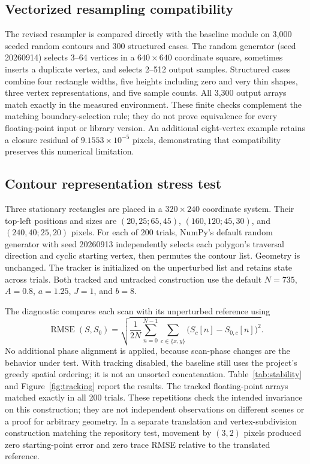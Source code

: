 \documentclass[11pt,a4paper]{article}
\begin{document}
\subsection{Vectorized resampling compatibility}
The revised resampler is compared directly with the baseline module on 3,000 seeded random contours and 300 structured cases. The random generator (seed 20260914) selects 3--64 vertices in a $640\times640$ coordinate square, sometimes inserts a duplicate vertex, and selects 2--512 output samples. Structured cases combine four rectangle widths, five heights including zero and very thin shapes, three vertex representations, and five sample counts. All 3,300 output arrays match exactly in the measured environment. These finite checks complement the matching boundary-selection rule; they do not prove equivalence for every floating-point input or library version. An additional eight-vertex example retains a closure residual of $9.1553\times10^{-5}$ pixels, demonstrating that compatibility preserves this numerical limitation.

\subsection{Contour representation stress test}
Three stationary rectangles are placed in a $320\times240$ coordinate system. Their top-left positions and sizes are $(20,25;65,45)$, $(160,120;45,30)$, and $(240,40;25,20)$ pixels. For each of 200 trials, NumPy's default random generator with seed 20260913 independently selects each polygon's traversal direction and cyclic starting vertex, then permutes the contour list. Geometry is unchanged. The tracker is initialized on the unperturbed list and retains state across trials. Both tracked and untracked construction use the default $N=735$, $A=0.8$, $a=1.25$, $J=1$, and $b=8$.

The diagnostic compares each scan with its unperturbed reference using
\begin{equation}
 \operatorname{RMSE}(S,S_0)=
 \sqrt{\frac{1}{2N}\sum_{n=0}^{N-1}\sum_{c\in\{x,y\}}
 \bigl(S_c[n]-S_{0,c}[n]\bigr)^2}.
 \label{eq:rmse}
\end{equation}
No additional phase alignment is applied, because scan-phase changes are the behavior under test. With tracking disabled, the baseline still uses the project's greedy spatial ordering; it is not an unsorted concatenation. Table~\ref{tab:stability} and Figure~\ref{fig:tracking} report the results. The tracked floating-point arrays matched exactly in all 200 trials. These repetitions check the intended invariance on this construction; they are not independent observations on different scenes or a proof for arbitrary geometry. In a separate translation and vertex-subdivision construction matching the repository test, movement by $(3,2)$ pixels produced zero starting-point error and zero trace RMSE relative to the translated reference.
\end{document}
